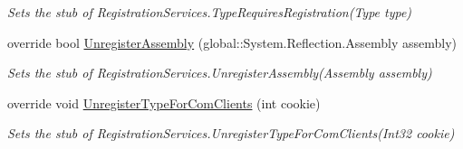 \begin{DoxyCompactItemize}
\begin{DoxyCompactList}\small\item\em Sets the stub of Registration\-Services.\-Type\-Requires\-Registration(\-Type type)\end{DoxyCompactList}\item 
override bool \hyperlink{class_system_1_1_runtime_1_1_interop_services_1_1_fakes_1_1_stub_registration_services_ac14251eb873a87cd5bf97b9a85238d20}{Unregister\-Assembly} (global\-::\-System.\-Reflection.\-Assembly assembly)
\begin{DoxyCompactList}\small\item\em Sets the stub of Registration\-Services.\-Unregister\-Assembly(\-Assembly assembly)\end{DoxyCompactList}\item 
override void \hyperlink{class_system_1_1_runtime_1_1_interop_services_1_1_fakes_1_1_stub_registration_services_ab9ffc92ee695b0ecfe572f6c2b57a670}{Unregister\-Type\-For\-Com\-Clients} (int cookie)
\begin{DoxyCompactList}\small\item\em Sets the stub of Registration\-Services.\-Unregister\-Type\-For\-Com\-Clients(\-Int32 cookie)\end{DoxyCompactList}\end{DoxyCompactItemize}

